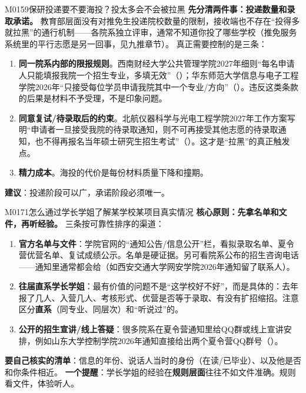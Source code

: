 \begin{qa}{M0159}{保研投递要不要海投？投太多会不会被拉黑}
\textbf{先分清两件事：投递数量和录取承诺。} 教育部层面没有对推免生投递院校数量的限制，接收端也不存在“投得多就拉黑”的通行机制——各院系独立评审，通常不知道你投了哪些学校（推免服务系统里的平行志愿是另一回事，见九推章节）。
真正需要控制的是三条：
\begin{enumerate}
  \item \textbf{同一院系内部的限报规则}。西南财经大学公共管理学院2027年细则“每名申请人只能填报我院一个招生专业，多填无效”（）；华东师范大学信息与电子工程学院2026年“只接受每位学员申请我院其中一个专业/方向”（）。违反这类条款的后果是材料不予受理，不是印象问题。
  \item \textbf{同意复试/待录取后的约束}。北航仪器科学与光电工程学院2027年工作方案写明“申请者一旦接受我院的待录取通知，则不可再接受其他志愿的待录取通知，也不得再报名当年硕士研究生招生考试”（）。这才是“拉黑”的真正触发点。
  \item \textbf{精力成本}。海投的代价是每份材料质量下降和撞期。
\end{enumerate}
\textbf{建议}：投递阶段可以广，承诺阶段必须唯一。
\end{qa}

\begin{qa}{M0171}{怎么通过学长学姐了解某学校某项目真实情况}
\textbf{核心原则：先拿名单和文件，再听经验。} 三条按可靠性排序的渠道：
\begin{enumerate}
  \item \textbf{官方名单与文件}：学院官网的“通知公告/信息公开”栏，看拟录取名单、夏令营优营名单、复试成绩公示。名单是硬证据。另可看院系公布的招生咨询电话——通知里通常都会给（如西安交通大学网安学院2026年通知留了联系人）。
  \item \textbf{往届直系学长学姐}：最有价值的问题不是“这学校好不好”，而是具体的：去年报了几人、入营几人、考核形式、优营是否等于录取、有没有扩招缩招。注意区分\textbf{直系}（同专业、同层次）和“听说过”的。
  \item \textbf{公开的招生宣讲/线上答疑}：很多院系在夏令营通知里给QQ群或线上宣讲安排，例如山东大学控制学院2026年通知直接给出两个夏令营QQ群号（）。
\end{enumerate}
\textbf{要自己核实的清单}：信息的年份、说话人当时的身份（在读/已毕业）、以及他是否和你条件相近。
\textbf{一个提醒}：学长学姐的经验在\textbf{规则层面}往往不如文件准确。规则看文件，体验听人。
\end{qa}

